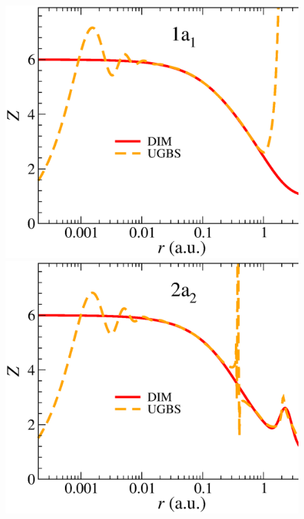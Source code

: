 \documentclass[10pt]{article}
\begin{document}
\begin{figure}[t]
\centering
\includegraphics[height=0.23\textheight]{figures/dimpot/zeff_1sCH4.eps}
\hspace{0.3cm}
\includegraphics[height=0.23\textheight]{figures/dimpot/zeff_2sCH4.eps}


\end{figure}
\end{document}
